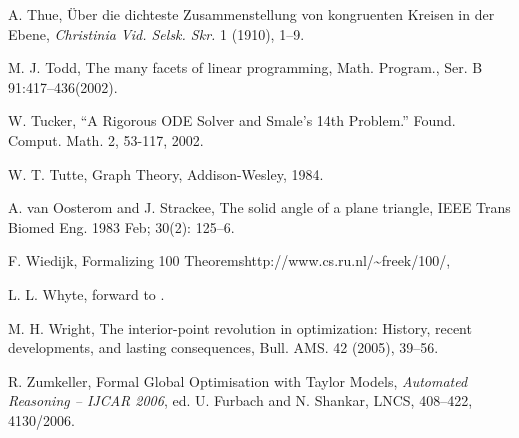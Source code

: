 \begin{thebibliography}{CHMS94}
 A. Thue, \"Uber die dichteste Zusammenstellung von
    kongruenten Kreisen in der Ebene, {\it Christinia Vid. Selsk. Skr.} 1
    (1910), 1--9.

 M. J. Todd, The many facets of linear programming,
Math. Program., Ser. B 91:417--436(2002). 

  W. Tucker, ``A Rigorous ODE Solver and Smale's 14th Problem.'' 
   Found. Comput. Math. 2, 53-117, 2002.

 W. T. Tutte, Graph Theory, Addison-Wesley, 1984.

 A. van Oosterom and J. Strackee, The solid
angle of a plane triangle, IEEE Trans Biomed Eng. 1983 Feb; 30(2):
125--6.

 F. Wiedijk, Formalizing 100
Theorems\hfil\break http://www.cs.ru.nl/\~{\hbox{}}freek/100/,

 L. L. Whyte, forward to \cite{Kep66}.

 M. H. Wright, The interior-point revolution in
optimization: History, recent developments, and lasting consequences,
Bull. AMS. 42 (2005), 39--56.


  R. Zumkeller,  Formal Global Optimisation with
 Taylor Models, {\it Automated Reasoning -- IJCAR 2006},
 ed. U. Furbach and N. Shankar, LNCS, 408--422, 4130/2006.




\end{thebibliography}
